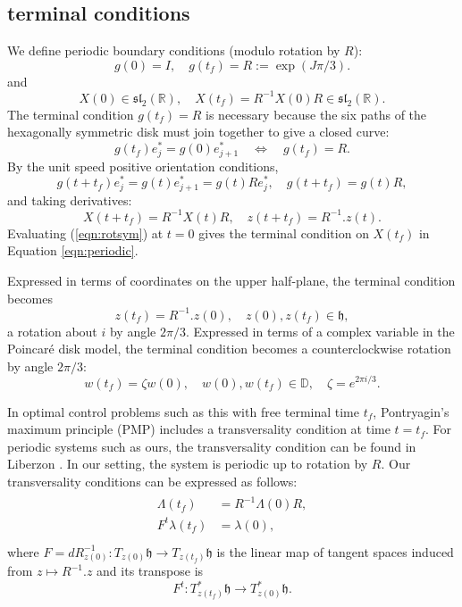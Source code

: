 \documentclass{article}
\theoremstyle{remark}
\newcommand{\ring}[1]{\mathbb{#1}}
\def\sl{\mathfrak{sl}_2(\ring{R})}
\def\h{\mathfrak h}
\def\D{\ring{D}}
\newcommand\ee[1]{e_{#1}^*}
\begin{document}
\subsection{terminal conditions}\label{sec:trans}


We define periodic boundary conditions (modulo rotation by $R$):
\[
g(0) = I,\quad g(t_f) = R := \exp(J\pi/3).
\]
and
\begin{equation}\label{eqn:periodic}
X(0) \in \sl,\quad X(t_f) = R^{-1} X(0) R \in \sl.
\end{equation}
The terminal condition $g(t_f)= R$ is necessary because the six paths
of the hexagonally symmetric disk must join together to give a closed
curve:
\begin{equation}\label{eqn:g-term}
g(t_f) \ee{j} = g(0) \ee{j+1}\quad \Leftrightarrow \quad g(t_f) = R.
\end{equation}
By the unit speed positive orientation conditions, 
\[
g(t+t_f) \ee{j} =
g(t) \ee{j+1} = g(t) R \ee{j},\quad
g(t + t_f) =g(t) R,
\] 
and taking derivatives: 
\begin{equation}\label{eqn:rotsym}
X(t+t_f) = R^{-1} X(t) R,\quad 
z(t+t_f) = R^{-1}.z(t).
\end{equation}
Evaluating (\ref{eqn:rotsym}) at
$t=0$ gives the terminal condition on $X(t_f)$ in Equation
\ref{eqn:periodic}.

Expressed in terms of coordinates on the upper half-plane, the
terminal condition becomes
\begin{equation}\label{eqn:z-term}
z(t_f) = R^{-1}. z(0),\quad z(0),z(t_f)\in \h,
\end{equation}
a rotation about $i$ by angle $2\pi/3$.
Expressed in terms of a complex variable in the Poincar\'e disk model,
the terminal condition becomes a counterclockwise rotation by angle
$2\pi/3$:
\[
w(t_f) = \zeta  w(0),\quad w(0),w(t_f) \in \D,\quad \zeta = e^{2\pi i/3}.
\]

In optimal control problems such as this with  free terminal time $t_f$,
Pontryagin's maximum principle (PMP) includes a transversality
condition at time $t=t_f$.  For periodic systems such as ours, the
transversality condition can be found in Liberzon
\cite[p134]{liberzon2012calculus}.  In our setting, the system is
periodic up to rotation by $R$.  Our transversality conditions can be
expressed as follows:
\begin{align}\label{eqn:transverse}
\begin{split}
\Lambda(t_f) &= R^{-1} \Lambda(0) R,\\
F^t\lambda(t_f) &= \lambda(0),\\
\end{split}
\end{align}
where $F=dR^{-1}_{z(0)}:T_{z(0)}\h\to T_{z(t_f)}\h$ is the 
linear map of tangent spaces
induced from $z\mapsto R^{-1}.z$ and 
 its transpose is 
\[
F^t:T^*_{z(t_f)}\h\to T^*_{z(0)}\h.
\]
\end{document}
